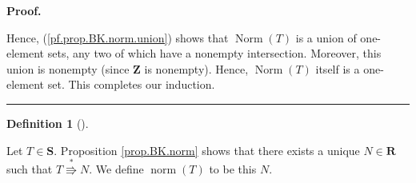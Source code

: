 \documentclass[numbers=enddot,12pt,final,onecolumn,notitlepage]{scrartcl}%
\theoremstyle{definition}
\newtheorem{defi}[theo]{Definition}
\newenvironment{definition}[1][]
{\begin{defi}[#1]\begin{leftbar}}
{\end{leftbar}\end{defi}}
\newtheorem{exmp}[theo]{Example}
\newenvironment{example}[1][]
{\begin{exmp}[#1]\begin{leftbar}}
{\end{leftbar}\end{exmp}}
\newenvironment{proof}[1][Proof]{\noindent\textbf{#1.} }{\ \rule{0.5em}{0.5em}}
\begin{document}
\begin{proof}
\begin{itemize}
\begin{comment}
}

\end{comment}

\end{itemize}

Hence, (\ref{pf.prop.BK.norm.union}) shows that $\operatorname*{Norm}\left(
T\right)  $ is a union of one-element sets, any two of which have a nonempty
intersection.
Moreover, this union is nonempty (since $\mathbf{Z}$ is nonempty). Hence,
$\operatorname*{Norm}\left(  T\right)  $ itself is a one-element set. This
completes our induction.
\end{proof}

\begin{definition}
Let $T\in\mathbf{S}$. Proposition \ref{prop.BK.norm} shows that there exists a
unique $N\in\mathbf{R}$ such that $T\overset{\ast}{\Rrightarrow}N$. We define
$\operatorname*{norm}\left(  T\right)  $ to be this $N$.
\end{definition}

\end{document}
